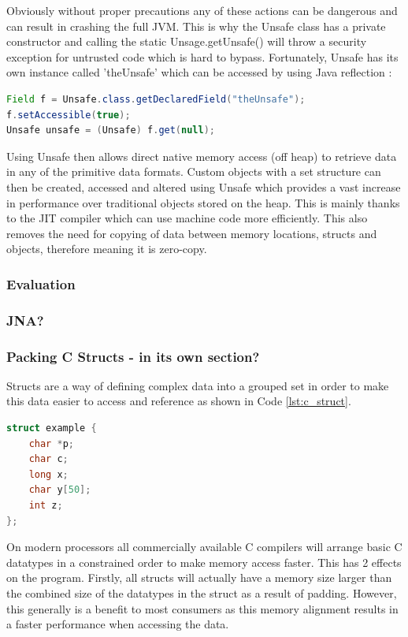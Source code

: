 \documentclass[final_report.tex]{subfiles}
\begin{document}
Obviously without proper precautions any of these actions can be dangerous and can result in crashing the full JVM. This is why the Unsafe class has a private constructor and calling the static Unsage.getUnsafe() will throw a security exception for untrusted code which is hard to bypass. Fortunately, Unsafe has its own instance called 'theUnsafe' which can be accessed by using Java reflection :

\begin{lstlisting}[language=Java, caption={Accessing Java Unsafe}, label=lst:java_unsafe]
Field f = Unsafe.class.getDeclaredField("theUnsafe");
f.setAccessible(true);
Unsafe unsafe = (Unsafe) f.get(null);
\end{lstlisting}

Using Unsafe then allows direct native memory access (off heap) to retrieve data in any of the primitive data formats. Custom objects with a set structure can then be created, accessed and altered using Unsafe which provides a vast increase in performance over traditional objects stored on the heap. This is mainly thanks to the JIT compiler which can use machine code more efficiently. This also removes the need for copying of data between memory locations, structs and objects, therefore meaning it is zero-copy.

\subsubsection{Evaluation}

\subsubsection{JNA?}

\subsubsection{Packing C Structs - in its own section?}
Structs are a way of defining complex data into a grouped set in order to make this data easier to access and reference as shown in Code \ref{lst:c_struct}.

\begin{lstlisting}[language=C, caption={Example C Struct}, label=lst:c_struct]
struct example {
    char *p;
    char c;
    long x;
    char y[50];
    int z;
};
\end{lstlisting}

On modern processors all commercially available C compilers will arrange basic C datatypes in a constrained order to make memory access faster. This has 2 effects on the program. Firstly, all structs will actually have a memory size larger than the combined size of the datatypes in the struct as a result of padding. However, this generally is a benefit to most consumers as this memory alignment results in a faster performance when accessing the data.
\end{document}
